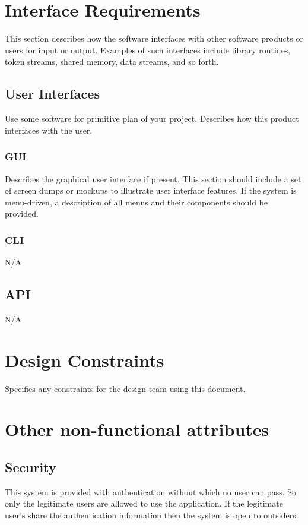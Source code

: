 \documentclass[]{article}
\begin{document}
\FloatBarrier
\section{Interface Requirements}
This section describes how the software interfaces with other software products or users for input or output. Examples of such interfaces include library routines, token streams, shared memory, data streams, and so forth. 

\subsection{User Interfaces}
Use some software for primitive plan of your project.
Describes how this product interfaces with the user. 

\subsubsection {GUI}
Describes the graphical user interface if present. This section should include a set of screen dumps or mockups to illustrate user interface features. 
If the system is menu-driven, a description of all menus and their components should be provided. 

\subsubsection { CLI}
N/A

\subsection {API}
N/A


\section{Design Constraints}
Specifies any constraints for the design team using this document. 

\section{Other non-functional attributes}


\subsection {Security}
This system is provided with authentication without which no user can pass. So only the legitimate users are allowed to use the application. If the legitimate user’s share the authentication information then the system is open to outsiders.
\end{document}

